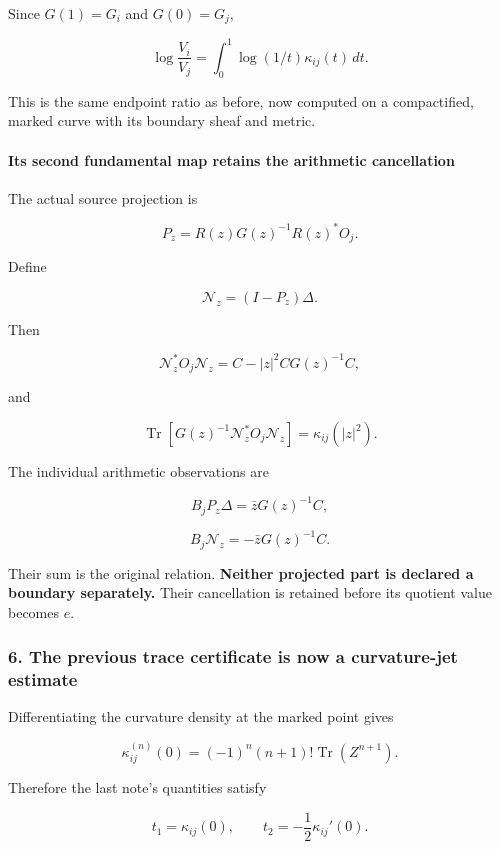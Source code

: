 Since \(G(1)=G_i\) and \(G(0)=G_j\),

\[
\boxed{
\log\frac{V_i}{V_j}
=
\int_0^1\log(1/t)\kappa_{ij}(t)\,dt.
}
\]

This is the same endpoint ratio as before, now computed on a compactified, marked curve with its boundary sheaf and metric.

\paragraph{Its second fundamental map retains the arithmetic cancellation}\label{endpoint-curvature_original--its-second-fundamental-map-retains-the-arithmetic-cancellation}

The actual source projection is

\[
P_z=R(z)G(z)^{-1}R(z)^*O_j.
\]

Define

\[
\mathcal N_z=(I-P_z)\Delta.
\]

Then

\[
\boxed{
\mathcal N_z^*O_j\mathcal N_z
=
C-|z|^2CG(z)^{-1}C,
}
\]

and

\[
\boxed{
\operatorname{Tr}\!\left[
G(z)^{-1}\mathcal N_z^*O_j\mathcal N_z
\right]
=
\kappa_{ij}(|z|^2).
}
\]

The individual arithmetic observations are

\[
B_jP_z\Delta=\bar zG(z)^{-1}C,
\]

\[
B_j\mathcal N_z=-\bar zG(z)^{-1}C.
\]

Their sum is the original relation. \textbf{Neither projected part is declared a boundary separately.} Their cancellation is retained before its quotient value becomes \(e\).

\subsubsection{6. The previous trace certificate is now a curvature-jet estimate}\label{endpoint-curvature_original--the-previous-trace-certificate-is-now-a-curvature-jet-estimate}

Differentiating the curvature density at the marked point gives

\[
\boxed{
\kappa_{ij}^{(n)}(0)
=
(-1)^n(n+1)!\operatorname{Tr}(Z^{n+1}).
}
\]

Therefore the last note's quantities satisfy

\[
\boxed{
t_1=\kappa_{ij}(0),
\qquad
t_2=-\frac12\kappa_{ij}'(0).
}
\]

